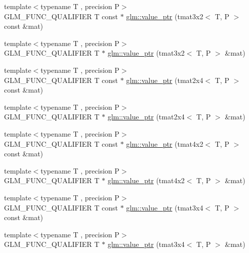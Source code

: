 \begin{DoxyCompactItemize}
\item 
{\footnotesize template$<$typename T , precision P$>$ }\\G\+L\+M\+\_\+\+F\+U\+N\+C\+\_\+\+Q\+U\+A\+L\+I\+F\+I\+ER T const  $\ast$ \hyperlink{group__gtc__type__ptr_ga398202d6ce304deb7da50badde85ee41}{glm\+::value\+\_\+ptr} (tmat3x2$<$ T, P $>$ const \&mat)
\item 
{\footnotesize template$<$typename T , precision P$>$ }\\G\+L\+M\+\_\+\+F\+U\+N\+C\+\_\+\+Q\+U\+A\+L\+I\+F\+I\+ER T $\ast$ \hyperlink{group__gtc__type__ptr_gad6a737f57febdef255873f6a44d0db0e}{glm\+::value\+\_\+ptr} (tmat3x2$<$ T, P $>$ \&mat)
\item 
{\footnotesize template$<$typename T , precision P$>$ }\\G\+L\+M\+\_\+\+F\+U\+N\+C\+\_\+\+Q\+U\+A\+L\+I\+F\+I\+ER T const  $\ast$ \hyperlink{group__gtc__type__ptr_ga2336cd68e72b0d295c8cd33eb1588480}{glm\+::value\+\_\+ptr} (tmat2x4$<$ T, P $>$ const \&mat)
\item 
{\footnotesize template$<$typename T , precision P$>$ }\\G\+L\+M\+\_\+\+F\+U\+N\+C\+\_\+\+Q\+U\+A\+L\+I\+F\+I\+ER T $\ast$ \hyperlink{group__gtc__type__ptr_ga0d745a55255710933effd6391307f681}{glm\+::value\+\_\+ptr} (tmat2x4$<$ T, P $>$ \&mat)
\item 
{\footnotesize template$<$typename T , precision P$>$ }\\G\+L\+M\+\_\+\+F\+U\+N\+C\+\_\+\+Q\+U\+A\+L\+I\+F\+I\+ER T const  $\ast$ \hyperlink{group__gtc__type__ptr_ga1de002422f32c6da9d65d3f257f37196}{glm\+::value\+\_\+ptr} (tmat4x2$<$ T, P $>$ const \&mat)
\item 
{\footnotesize template$<$typename T , precision P$>$ }\\G\+L\+M\+\_\+\+F\+U\+N\+C\+\_\+\+Q\+U\+A\+L\+I\+F\+I\+ER T $\ast$ \hyperlink{group__gtc__type__ptr_ga0e62660f9066864568cd74d76d528a6e}{glm\+::value\+\_\+ptr} (tmat4x2$<$ T, P $>$ \&mat)
\item 
{\footnotesize template$<$typename T , precision P$>$ }\\G\+L\+M\+\_\+\+F\+U\+N\+C\+\_\+\+Q\+U\+A\+L\+I\+F\+I\+ER T const  $\ast$ \hyperlink{group__gtc__type__ptr_gacbf08ea2313cad8a42652d4455e69709}{glm\+::value\+\_\+ptr} (tmat3x4$<$ T, P $>$ const \&mat)
\item 
{\footnotesize template$<$typename T , precision P$>$ }\\G\+L\+M\+\_\+\+F\+U\+N\+C\+\_\+\+Q\+U\+A\+L\+I\+F\+I\+ER T $\ast$ \hyperlink{group__gtc__type__ptr_gafac7c10d557c3db2f061af0ffe8fc9cf}{glm\+::value\+\_\+ptr} (tmat3x4$<$ T, P $>$ \&mat)

\end{DoxyCompactItemize}
